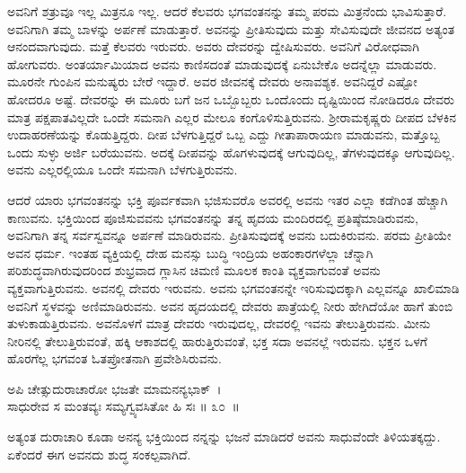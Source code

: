 ಅವನಿಗೆ ಶತ್ರುವೂ ಇಲ್ಲ ಮಿತ್ರನೂ ಇಲ್ಲ. ಆದರೆ ಕೆಲವರು ಭಗವಂತನನ್ನು ತಮ್ಮ ಪರಮ ಮಿತ್ರನೆಂದು ಭಾವಿಸುತ್ತಾರೆ. ಅವನಿಗಾಗಿ ತಮ್ಮ ಬಾಳನ್ನು ಅರ್ಪಣೆ ಮಾಡುತ್ತಾರೆ. ಅವನನ್ನು ಪ್ರೀತಿಸುವುದು ಮತ್ತು ಸೇವಿಸುವುದೇ ಜೀವನದ ಅತ್ಯಂತ ಆನಂದವಾಗುವುದು. ಮತ್ತೆ ಕೆಲವರು ಇರುವರು. ಅವರು ದೇವರನ್ನು ದ್ವೇಷಿಸುವರು. ಅವನಿಗೆ ವಿರೋಧವಾಗಿ ಹೋಗುವರು. ಅಂತರ್ಯಾಮಿಯಾದ ಅವನು ಕಾಣಿಸದಂತೆ ಮಾಡುವುದಕ್ಕೆ ಏನುಬೇಕೊ ಅದನ್ನೆಲ್ಲಾ ಮಾಡುವರು. ಮೂರನೇ ಗುಂಪಿನ ಮನುಷ್ಯರು ಬೇರೆ ಇದ್ದಾರೆ. ಅವರ ಜೀವನಕ್ಕೆ ದೇವರು ಅನಾವಶ್ಯಕ. ಅವನಿದ್ದರೆ ಎಷ್ಟೋ ಹೋದರೂ ಅಷ್ಟೆ. ದೇವರನ್ನು ಈ ಮೂರು ಬಗೆ ಜನ ಒಬ್ಬೊಬ್ಬರು ಒಂದೊಂದು ದೃಷ್ಟಿಯಿಂದ ನೋಡಿದರೂ ದೇವರು ಮಾತ್ರ ಪಕ್ಷಪಾತವಿಲ್ಲದೇ ಒಂದೇ ಸಮನಾಗಿ ಎಲ್ಲರ ಮೇಲೂ ಕಂಗೊಳಿಸುತ್ತಿರುವನು. ಶ‍್ರೀರಾಮಕೃಷ್ಣರು ದೀಪದ ಬೆಳಕಿನ ಉದಾಹರಣೆಯನ್ನು ಕೊಡುತ್ತಿದ್ದರು. ದೀಪ ಬೆಳಗುತ್ತಿದ್ದರೆ ಒಬ್ಬ ಎದ್ದು ಗೀತಾಪಾರಾಯಣ ಮಾಡುವನು, ಮತ್ತೊಬ್ಬ ಒಂದು ಸುಳ್ಳು ಅರ್ಜಿ ಬರೆಯುವನು. ಅದಕ್ಕೆ ದೀಪವನ್ನು ಹೊಗಳುವುದಕ್ಕೆ ಆಗುವುದಿಲ್ಲ, ತೆಗಳುವುದಕ್ಕೂ ಆಗುವುದಿಲ್ಲ. ಅವನು ಎಲ್ಲರಲ್ಲಿಯೂ ಒಂದೇ ಸಮನಾಗಿ ಬೆಳಗುತ್ತಿರುವನು.

ಆದರೆ ಯಾರು ಭಗವಂತನನ್ನು ಭಕ್ತಿ ಪೂರ್ವಕವಾಗಿ ಭಜಿಸುವರೊ ಅವರಲ್ಲಿ ಅವನು ಇತರ ಎಲ್ಲಾ ಕಡೆಗಿಂತ ಹೆಚ್ಚಾಗಿ ಕಾಣುವನು. ಭಕ್ತಿಯಿಂದ ಪೂಜಿಸುವವನು ಭಗವಂತನನ್ನು ತನ್ನ ಹೃದಯ ಮಂದಿರದಲ್ಲಿ ಪ್ರತಿಷ್ಠೆಮಾಡಿರುವನು, ಅವನಿಗಾಗಿ ತನ್ನ ಸರ್ವಸ್ವವನ್ನೂ ಅರ್ಪಣೆ ಮಾಡಿರುವನು. ಪ್ರೀತಿಸುವುದಕ್ಕೆ ಅವನು ಬದುಕಿರುವನು. ಪರಮ ಪ್ರೀತಿಯೇ ಅವನ ಧರ್ಮ. ಇಂತಹ ವ್ಯಕ್ತಿಯಲ್ಲಿ ದೇಹ ಮನಸ್ಸು ಬುದ್ಧಿ ಇಂದ್ರಿಯ ಅಹಂಕಾರಗಳೆಲ್ಲಾ ಚೆನ್ನಾಗಿ ಪರಿಶುದ್ಧವಾಗಿರುವುದರಿಂದ ಶುಭ್ರವಾದ ಗ್ಲಾಸಿನ ಚಿಮಣಿ ಮೂಲಕ ಕಾಂತಿ ವ್ಯಕ್ತವಾಗುವಂತೆ ಅವನು ವ್ಯಕ್ತವಾಗುತ್ತಿರುವನು. ಅವನಲ್ಲಿ ದೇವರು ಇರುವನು. ಅವನು ಭಗವಂತನನ್ನೇ ಇರಿಸುವುದಕ್ಕಾಗಿ ಎಲ್ಲವನ್ನೂ ಖಾಲಿಮಾಡಿ ಅವನಿಗೆ ಸ್ಥಳವನ್ನು ಅಣಿಮಾಡಿರುವನು. ಅವನ ಹೃದಯದಲ್ಲಿ ದೇವರು ಪಾತ್ರೆಯಲ್ಲಿ ನೀರು ಹೇಗಿದೆಯೋ ಹಾಗೆ ತುಂಬಿ ತುಳುಕಾಡುತ್ತಿರುವನು. ಅವನೊಳಗೆ ಮಾತ್ರ ದೇವರು ಇರುವುದಲ್ಲ, ದೇವರಲ್ಲಿ ಇವನು ತೇಲುತ್ತಿರುವನು. ಮೀನು ನೀರಿನಲ್ಲಿ ತೇಲುತ್ತಿರುವಂತೆ, ಹಕ್ಕಿ ಆಕಾಶದಲ್ಲಿ ಹಾರುತ್ತಿರುವಂತೆ, ಭಕ್ತ ಸದಾ ಅವನಲ್ಲೆ ಇರುವನು. ಭಕ್ತನ ಒಳಗೆ ಹೊರಗೆಲ್ಲ ಭಗವಂತ ಓತಪ್ರೋತನಾಗಿ ಪ್ರವೇಶಿಸಿರುವನು.

\begin{shloka}
ಅಪಿ ಚೇತ್ಸುದುರಾಚಾರೋ ಭಜತೇ ಮಾಮನನ್ಯಭಾಕ್~।\\ಸಾಧುರೇವ ಸ ಮಂತವ್ಯಃ ಸಮ್ಯಗ್ವ್ಯವಸಿತೋ ಹಿ ಸಃ \hfill॥ ೩೦~॥
\end{shloka}

\begin{artha}
ಅತ್ಯಂತ ದುರಾಚಾರಿ ಕೂಡಾ ಅನನ್ಯ ಭಕ್ತಿಯಿಂದ ನನ್ನನ್ನು ಭಜನೆ ಮಾಡಿದರೆ ಅವನು ಸಾಧುವೆಂದೇ ತಿಳಿಯತಕ್ಕದ್ದು. ಏಕೆಂದರೆ ಈಗ ಅವನದು ಶುದ್ಧ ಸಂಕಲ್ಪವಾಗಿದೆ.
\end{artha}

